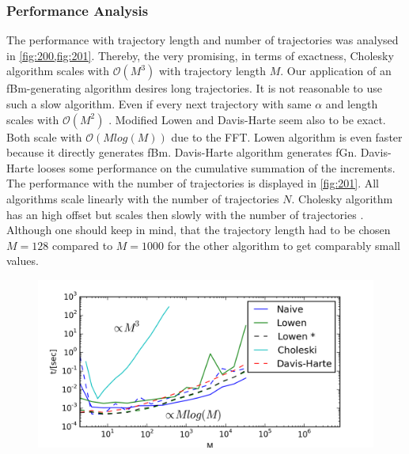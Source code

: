 \documentclass[
  a4paper,BCOR10mm,twoside,
  headsepline,footsepline,%
  fleqn,openbib
]{scrbook}
\begin{document}
\subsubsection{Performance Analysis}
The performance with trajectory length and number of trajectories was analysed in \cref{fig:200,fig:201}. Thereby, the very promising, in terms of exactness, Cholesky algorithm scales with $\mathcal{O}(M^3)$ with trajectory length $M$. Our application of an fBm-generating algorithm desires long trajectories. It is not reasonable to use such a slow algorithm. Even if every next trajectory with same $\alpha$ and length scales with $\mathcal{O}(M^2)$ \cite{Dieker2004}.  Modified Lowen and Davis-Harte seem also to be exact. Both scale with $\mathcal{O}(M log(M))$ due to the FFT. Lowen algorithm is even faster because it directly generates fBm. Davis-Harte algorithm generates fGn. Davis-Harte looses some performance on the cumulative summation of the increments. The performance with the number of trajectories is displayed in \cref{fig:201}. All algorithms scale linearly with the number of trajectories $N$. Cholesky algorithm has an high offset but scales then slowly with the number of trajectories . Although one should keep in mind, that the trajectory length had to be chosen $M=128$ compared to $M=1000$ for the other algorithm to get comparably small values.
\begin{figure}[h!]
  \centering
  \includegraphics[width=\linewidth]{./data/nongaussiandouble1.png}
  \captionsetup{width=1.0\linewidth}
  \label{fig:200}
\end{figure}
\end{document}
